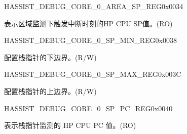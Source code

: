\begin{register}{H}{ASSIST\_DEBUG\_CORE\_0\_AREA\_SP\_REG}{0x0034}\label{regdesc:ASSISTDEBUGCORE0AREASPREG}
%
\regnewline%
\begin{regdesc}\begin{reglist}
\label{fielddesc:ASSISTDEBUGCORE0AREASP}\item [ASSIST\_DEBUG\_CORE\_0\_AREA\_SP] 表示区域监测下触发中断时刻的HP CPU SP值。(RO)
\end{reglist}\end{regdesc}
\end{register}


\begin{register}{H}{ASSIST\_DEBUG\_CORE\_0\_SP\_MIN\_REG}{0x0038}\label{regdesc:ASSISTDEBUGCORE0SPMINREG}
%
\regnewline%
\begin{regdesc}\begin{reglist}
\label{fielddesc:ASSISTDEBUGCORE0SPMIN}\item [ASSIST\_DEBUG\_CORE\_0\_SP\_MIN] 配置栈指针的下边界。(R/W)
\end{reglist}\end{regdesc}
\end{register}


\begin{register}{H}{ASSIST\_DEBUG\_CORE\_0\_SP\_MAX\_REG}{0x003C}\label{regdesc:ASSISTDEBUGCORE0SPMAXREG}
%
\regnewline%
\begin{regdesc}\begin{reglist}
\label{fielddesc:ASSISTDEBUGCORE0SPMAX}\item [ASSIST\_DEBUG\_CORE\_0\_SP\_MAX] 配置栈指针的上边界。(R/W)
\end{reglist}\end{regdesc}
\end{register}


\begin{register}{H}{ASSIST\_DEBUG\_CORE\_0\_SP\_PC\_REG}{0x0040}\label{regdesc:ASSISTDEBUGCORE0SPPCREG}
%
\regnewline%
\begin{regdesc}\begin{reglist}
\label{fielddesc:ASSISTDEBUGCORE0SPPC}\item [ASSIST\_DEBUG\_CORE\_0\_SP\_PC] 表示栈指针监测的 HP CPU PC 值。(RO)
\end{reglist}\end{regdesc}
\end{register}


